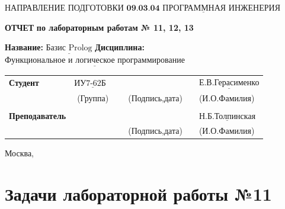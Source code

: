 \documentclass[12pt,a4paper]{article}
\begin{document}
	\noindent НАПРАВЛЕНИЕ ПОДГОТОВКИ $\underline{\textbf{09.03.04 ПРОГРАММНАЯ ИНЖЕНЕРИЯ}}$\newline\newline\newline\newline\newline\newline\newline
	\begin{center}
		\begin{flushright}
			\Large\textbf{ОТЧЕТ}\newline
			\Large\textbf{по лабораторным работам № 11, 12, 13}\newline
		\end{flushright}
	\end{center}
	\noindent\textbf{Название:} $\underline{\text{Базис Prolog}}$\newline\newline
	\noindent\textbf{Дисциплина:} $\underline{\text{Функциональное и логическое программирование}}$\newline\newline\newline\newline\newline\newline\newline\newline
	\begin{tabular}{lcp{5em}lp{2em}l}
		\noindent\textbf{Студент} &  $\underline{\text{ИУ7-62Б~~}}$ &             &\hspace{1cm} & & $\underline{\text{Е.В.Герасименко}}$ \\\cline{4-3}
		& (Группа) & &(Подпись,дата)  & & (И.О.Фамилия) \\
		& & & & &\\
		\noindent\textbf{Преподаватель} &  & &\hspace{1cm} & &$\underline{\text{Н.Б.Толпинская}}$ \\\cline{4-3} 
		&  & & (Подпись,дата)  & &(И.О.Фамилия) \\
	\end{tabular}
	\begin{center}
		\vfill
		Москва,\the\year
	\end{center}
	\newpage


\section{Задачи лабораторной работы №11}
\end{document}
